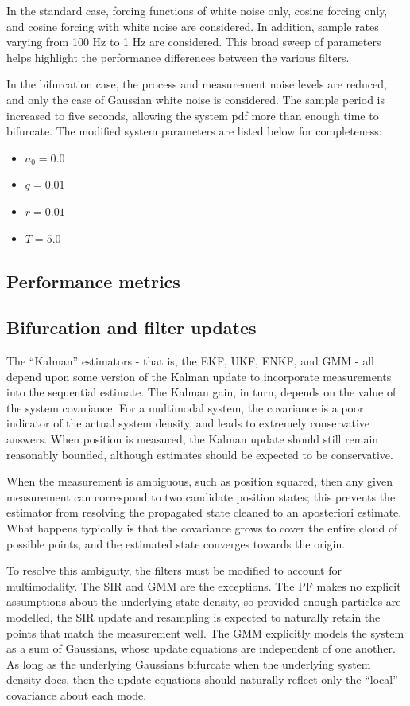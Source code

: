 \documentclass[]{article}
\begin{document}
In the standard case, forcing functions of white noise only, cosine forcing only, and cosine forcing with white noise are considered. In addition, sample rates varying from 100 Hz to 1 Hz are considered. This broad sweep of parameters helps highlight the performance differences between the various filters.

In the bifurcation case, the process and measurement noise levels are reduced, and only the case of Gaussian white noise is considered. The sample period is increased to five seconds, allowing the system pdf more than enough time to bifurcate. The modified system parameters are listed below for completeness:
\begin{itemize}
\item $a_0 = 0.0$
\item $q = 0.01$
\item $r = 0.01$
\item $T = 5.0$
\end{itemize}

\subsection{Performance metrics}

\subsection{Bifurcation and filter updates}

The ``Kalman'' estimators - that is, the EKF, UKF, ENKF, and GMM - all depend upon some version of the Kalman update to incorporate measurements into the sequential estimate. The Kalman gain, in turn, depends on the value of the system covariance. For a multimodal system, the covariance is a poor indicator of the actual system density, and leads to extremely conservative answers. When position is measured, the Kalman update should still remain reasonably bounded, although estimates should be expected to be conservative.

When the measurement is ambiguous, such as position squared, then any given measurement can correspond to two candidate position states; this prevents the estimator from resolving the propagated state cleaned to an aposteriori estimate. What happens typically is that the covariance grows to cover the entire cloud of possible points, and the estimated state converges towards the origin.

To resolve this ambiguity, the filters must be modified to account for multimodality. The SIR and GMM are the exceptions. The PF makes no explicit assumptions about the underlying state density, so provided enough particles are modelled, the SIR update and resampling is expected to naturally retain the points that match the measurement well. The GMM explicitly models the system as a sum of Gaussians, whose update equations are independent of one another. As long as the underlying Gaussians bifurcate when the underlying system density does, then the update equations should naturally reflect only the ``local'' covariance about each mode.
\end{document}
